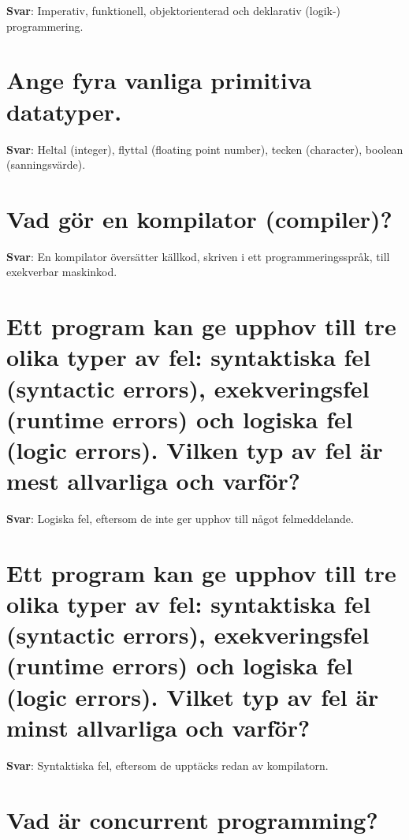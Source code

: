 \documentclass[a4paper,11pt,oneside]{book}
\begin{document}
\begin{sloppypar}
\label{q:199:sa:sv:True}

\textbf{Svar}: Imperativ, funktionell, objektorienterad och deklarativ (logik-) programmering.



\section{Ange fyra vanliga primitiva datatyper.}

\label{q:200:sa:sv:True}

\textbf{Svar}: Heltal (integer), flyttal (floating point number), tecken (character), boolean (sanningsv\"arde).



\section{Vad g\"or en kompilator (compiler)?}

\label{q:201:sa:sv:True}

\textbf{Svar}: En kompilator \"overs\"atter k\"allkod, skriven i ett programmeringsspr\r{a}k, till exekverbar maskinkod.



\section{Ett program kan ge upphov till tre olika typer av fel: syntaktiska fel (syntactic errors), exekveringsfel (runtime errors) och logiska fel (logic errors). Vilken typ av fel \"ar mest allvarliga och varf\"or?}

\label{q:202:sa:sv:True}

\textbf{Svar}: Logiska fel, eftersom de inte ger upphov till n\r{a}got felmeddelande.



\section{Ett program kan ge upphov till tre olika typer av fel: syntaktiska fel (syntactic errors), exekveringsfel (runtime errors) och logiska fel (logic errors). Vilket typ av fel \"ar minst allvarliga och varf\"or?}

\label{q:203:sa:sv:True}

\textbf{Svar}: Syntaktiska fel, eftersom de uppt\"acks redan av kompilatorn.



\section{Vad \"ar concurrent programming?}


\end{sloppypar}
\end{document}
